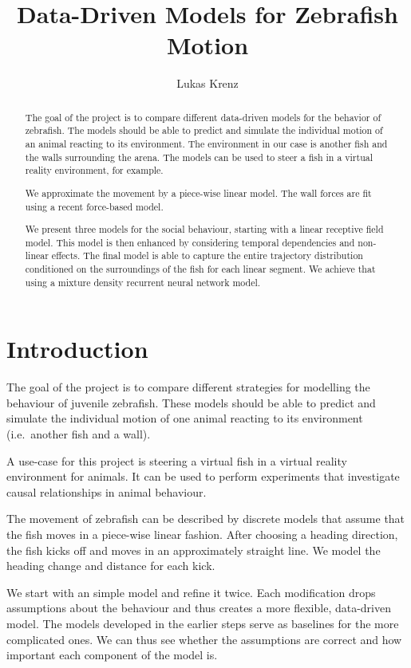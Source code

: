\documentclass[nobib, a4paper]{tufte-handout}
\title{Data-Driven Models for Zebrafish Motion}
\author[Lukas Krenz]{Lukas Krenz}
\begin{document}
\maketitle%

\begin{abstract}
\noindent
The goal of the project is to compare different data-driven models for the behavior of zebrafish.
The models should be able to predict and simulate the individual motion of an animal reacting to its environment.
The environment in our case is another fish and the walls surrounding the arena.
The models can be used to steer a fish in a virtual reality environment, for example.

We approximate the movement by a piece-wise linear model.
The wall forces are fit using a recent force-based model.

We present three models for the social behaviour, starting with a linear receptive field model.
This model is then enhanced by considering temporal dependencies and non-linear effects.
The final model is able to capture the entire trajectory distribution conditioned on the surroundings of the fish for each linear segment.
We achieve that using a mixture density recurrent neural network model.
\end{abstract}

\section{Introduction}
The goal of the project is to compare different strategies for modelling the behaviour of juvenile zebrafish.
These models should be able to predict and simulate the individual motion of one animal reacting to its environment (i.e.\ another fish and a wall).

A use-case for this project is steering a virtual fish in a virtual reality environment for animals.
It can be used to perform experiments that investigate causal relationships in animal behaviour.

The movement of zebrafish can be described by discrete models that assume that the fish moves in a piece-wise linear fashion.
After choosing a heading direction, the fish kicks off and moves in an approximately straight line.
We model the heading change and distance for each kick.

We start with an simple model and refine it twice.
Each modification drops assumptions about the behaviour and thus creates a more flexible, data-driven model.
The models developed in the earlier steps serve as baselines for the more complicated ones.
We can thus see whether the assumptions are correct and how important each component of the model is.
\end{document}
